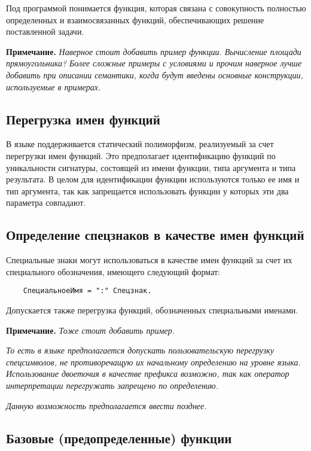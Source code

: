 {Под программой понимается функция, которая связана с совокупность полностью определенных и взаимосвязанных функций, обеспечивающих решение поставленной задачи.

\textbf{Примечание.}
\textit{Наверное стоит добавить пример функции. Вычисление площади прямоугольника? Более сложные примеры с условиями и прочим наверное лучше добавить при описании семантики, когда будут введены основные конструкции, используемые в примерах.}

\subsection{Перегрузка имен функций}

В языке поддерживается статический полиморфизм, реализуемый за счет перегрузки имен функций. Это предполагает идентификацию функций по уникальности сигнатуры, состоящей из имени функции, типа аргумента и типа результата. В целом для идентификации функции используются только ее имя и тип аргумента, так как запрещается использовать функции у которых эти два параметра совпадают.

\subsection{Определение спецзнаков в качестве имен функций}

Специальные знаки могут использоваться в качестве имен функций за счет их специального обозначения, имеющего следующий формат:

\begin{verbatim}
    СпециальноеИмя = ":" Спецзнак.
\end{verbatim}

Допускается также перегрузка функций, обозначенных специальными именами.

\textbf{Примечание.}
\textit{Тоже стоит добавить пример.}

\textit{То есть в языке предполагается допускать пользовательскую перегрузку спецсимволов, не противоречащую их начальному определению на уровне языка. Использование двоеточия в качестве префикса возможно, так как оператор интерпретации перегружать запрещено по определению.}

\textit{Данную возможность предполагается ввести позднее.}

\subsection{Базовые (предопределенные) функции}

}
